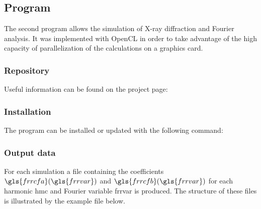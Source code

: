 \newpage

\subsection{Program}

The second program allows the simulation of X-ray diffraction and Fourier analysis.
It was implemented with OpenCL in order to take advantage of the high capacity of parallelization of the calculations on a graphics card.

\subsubsection{Repository}

Useful information can be found on the project page: 

\subsubsection{Installation}

The program can be installed or updated with the following command:


\subsubsection{Output data}

For each simulation a file containing the coefficients \( \gls{frrcfa}(\gls{frrvar}) \) and \( \gls{frrcfb}(\gls{frrvar}) \) for each harmonic \gls{hmc} and Fourier variable \gls{frrvar} is produced.
The structure of these files is illustrated by the example file below.


